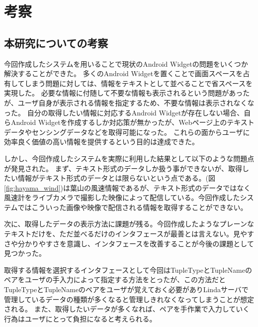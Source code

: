 \chapter{考察}
\label{chap:consideration}

\section{本研究についての考察}
今回作成したシステムを用いることで現状のAndroid Widgetの問題をいくつか解決することができた。
多くのAndroid Widgetを置くことで画面スペースを占有してしまう問題に対しては、情報をテキストとして並べることで省スペースを実現した。
必要な情報に付随して不要な情報も表示されるという問題があったが、ユーザ自身が表示される情報を指定するため、不要な情報は表示されなくなった。
自分の取得したい情報に対応するAndroid Widgetが存在しない場合、自らAndroid Widgetを作成するしか対応策が無かったが、Webページ上のテキストデータやセンシングデータなどを取得可能になった。
これらの面からユーザに効率良く価値の高い情報を提供するという目的は達成できた。

しかし、今回作成したシステムを実際に利用した結果として以下のような問題点が発見された。
まず、テキスト形式のデータしか扱う事ができないが、取得したい情報がテキスト形式のデータとは限らないという点である。(図\ref{fig:hayama_wind})は葉山の風速情報であるが、テキスト形式のデータではなく風速計をライブカメラで撮影した映像によって配信している。今回作成したシステムではこういった画像や映像で配信される情報を取得することができない。

次に、取得したデータの表示方法に課題が残る。今回作成したようなプレーンなテキストだけを、ただ並べるだけのインタフェースが最善とは言えない。見やすさや分かりやすさを意識し、インタフェースを改善することが今後の課題として見つかった。

取得する情報を選択するインタフェースとして今回はTupleTypeとTupleNameのペアをユーザの手入力によって指定する方法をとったが、この方法だとTupleTypeとTupleNameのペアをユーザが覚えておく必要がありLindaサーバで管理しているデータの種類が多くなると管理しきれなくなってしまうことが想定される。
また、取得したいデータが多くなれば、ペアを手作業で入力していく行為はユーザにとって負担になると考えられる。

